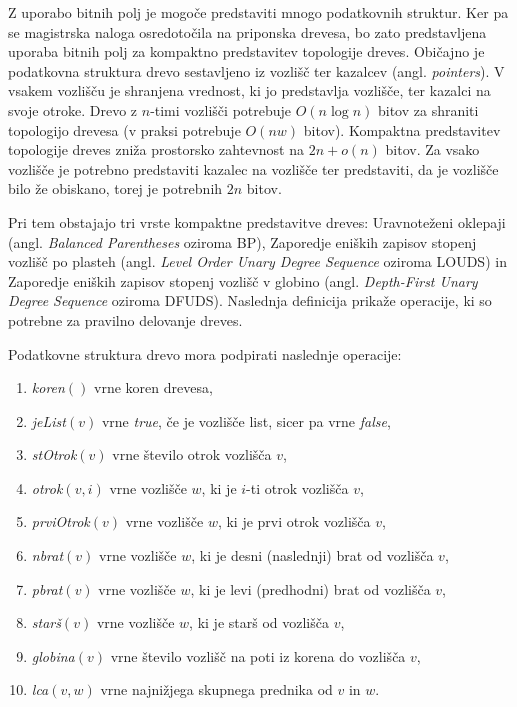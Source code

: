 Z uporabo bitnih polj je mogoče predstaviti mnogo podatkovnih struktur. Ker pa se magistrska naloga osredotočila na priponska drevesa, bo zato predstavljena uporaba bitnih polj za kompaktno predstavitev topologije dreves. Običajno je podatkovna struktura drevo sestavljeno iz vozlišč ter kazalcev (angl. \textit{pointers}). V vsakem vozlišču je shranjena vrednost, ki jo predstavlja vozlišče, ter kazalci na svoje otroke. Drevo z $n$-timi vozlišči potrebuje $O(n\log{n})$ bitov za shraniti topologijo drevesa (v praksi potrebuje $O(nw)$ bitov). Kompaktna predstavitev topologije dreves zniža prostorsko zahtevnost na $2n+o(n)$ bitov. Za vsako vozlišče je potrebno predstaviti kazalec na vozlišče ter predstaviti, da je vozlišče bilo že obiskano, torej je potrebnih $2n$ bitov.

Pri tem obstajajo tri vrste kompaktne predstavitve dreves: Uravnoteženi oklepaji (angl. \textit{Balanced Parentheses} oziroma BP), Zaporedje eniških zapisov stopenj vozlišč po plasteh (angl. \textit{Level Order Unary Degree Sequence} oziroma LOUDS) in Zaporedje eniških zapisov stopenj vozlišč v globino (angl. \textit{Depth-First Unary Degree Sequence} oziroma DFUDS).
Naslednja definicija prikaže operacije, ki so potrebne za pravilno delovanje dreves.


\begin{defi}\label{def:drevo}
    Podatkovne struktura drevo mora podpirati naslednje operacije:
    \begin{enumerate}
        \item \textit{koren}$()$ vrne koren drevesa,
        \item \textit{jeList}$(v)$ vrne \textit{true}, če je vozlišče list, sicer pa vrne \textit{false},
        \item \textit{stOtrok}$(v)$ vrne število otrok vozlišča $v$,
        \item \textit{otrok}$(v,i)$ vrne vozlišče $w$, ki je $i$-ti otrok vozlišča $v$,
        \item \textit{prviOtrok}$(v)$ vrne vozlišče $w$, ki je prvi otrok vozlišča $v$,
        \item \textit{nbrat}$(v)$ vrne vozlišče $w$, ki je desni (naslednji) brat od vozlišča $v$,
        \item \textit{pbrat}$(v)$ vrne vozlišče $w$, ki je levi (predhodni) brat od vozlišča $v$,
        \item \textit{starš}$(v)$ vrne vozlišče $w$, ki je starš od vozlišča $v$,
        \item \textit{globina}$(v)$ vrne število vozlišč na poti iz korena do vozlišča $v$, %
        \item \textit{lca}$(v,w)$ vrne najnižjega skupnega prednika od $v$ in $w$.
    \end{enumerate}
\end{defi}


